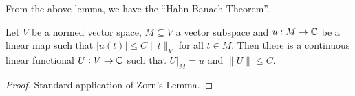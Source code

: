 From the above lemma, we have the ``Hahn-Banach Theorem''.

\begin{theorem}
    Let $V$ be a normed vector space, $M\subseteq V$ a vector subspace and $u: M\to\mathbb{C}$ be a linear map such that $|u(t)|\le C\|t\|_V$ for all $t\in M$. Then there is a continuous linear functional $U: V\to\mathbb{C}$ such that $U|_M = u$ and $\|U\|\le C$.
\end{theorem}
\begin{proof}
    Standard application of Zorn's Lemma.
\end{proof}